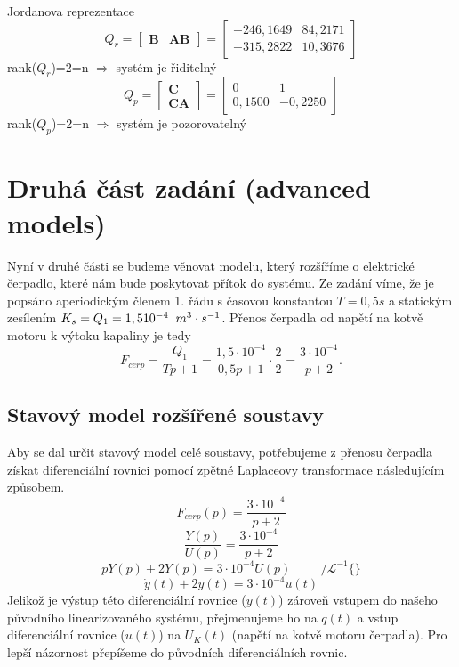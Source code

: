 \documentclass{article}
\begin{document}
			Jordanova reprezentace
				\[Q_{r}=\begin{bmatrix}
					\textbf{B}& \textbf{AB}
				\end{bmatrix}=\begin{bmatrix}
					-246,1649&84,2171\\
					-315,2822&10,3676
				\end{bmatrix}\]\hspace{11cm}rank(\(Q_{r}\))=2=n $\Rightarrow$ systém je řiditelný
				\[Q_{p}=\begin{bmatrix}
					\textbf{C}\\ \textbf{CA}
				\end{bmatrix}=\begin{bmatrix}
					0&1\\
					0,1500&-0,2250
				\end{bmatrix}\]\hspace{11cm}rank(\(Q_{p}\))=2=n $\Rightarrow$ systém je pozorovatelný\\
	\newpage
	\section{Druhá část zadání (advanced models)}
		Nyní v druhé části se budeme věnovat modelu, který rozšíříme o elektrické čerpadlo, které nám bude poskytovat přítok do systému. Ze zadání víme, že je popsáno aperiodickým členem 1. řádu s časovou konstantou \(T=0,5s\) a statickým zesílením \(K_{s}=Q_{1}=1,510^{-4} \hspace{2mm} m^{3}\cdot s^{-1}\). Přenos čerpadla od napětí na kotvě motoru k výtoku kapaliny je tedy
		\[F_{cerp}=\frac{Q_{1}}{Tp +1}=\frac{1,5\cdot10^{-4}}{0,5 p+1}\cdot\frac{2}{2}=\frac{3\cdot10^{-4}}{p+2}.\]
		\subsection{Stavový model rozšířené soustavy}
			Aby se dal určit stavový model celé soustavy, potřebujeme z přenosu čerpadla získat diferenciální rovnici pomocí zpětné Laplaceovy transformace následujícím způsobem.
			\[F_{cerp}(p)=\frac{3\cdot10^{-4}}{p+2}\]
			\[\frac{Y(p)}{U(p)}=\frac{3\cdot10^{-4}}{p+2}\]
			\[pY(p) + 2 Y(p)=3\cdot10^{-4} U(p)\hspace{1cm} /\mathscr{L}^{-1}\{\}\]
			\[\dot{y}(t)+2 y(t)=3\cdot10^{-4} u(t)\]
			Jelikož je výstup této diferenciální rovnice (\(y(t)\)) zároveň vstupem do našeho původního linearizovaného systému, přejmenujeme ho na \(q(t)\) a vstup diferenciální rovnice (\(u(t)\)) na \(U_{K}(t)\) (napětí na kotvě motoru čerpadla). Pro lepší názornost  přepíšeme do původních diferenciálních rovnic.
\end{document}
